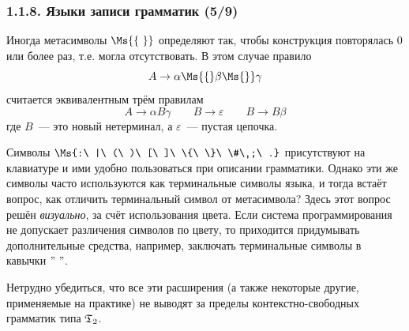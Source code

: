 \begin{frame}
\frametitle{1.1.8. Языки записи грамматик (5/9)}

\vspace{-2pt}
Иногда метасимволы $\Ms{\{\ \}}$ определяют так, чтобы конструкция
повторялась 0 или более раз, т.е. могла отсутствовать. В этом
случае правило
$$
A\rightarrow \alpha\Ms{\{}\beta\Ms{\}}\gamma
$$
считается эквивалентным трём правилам
$$
A\rightarrow \alpha B\gamma 
\qquad B\rightarrow\varepsilon 
\qquad B\rightarrow B \beta
$$
где $B$~--- это новый нетерминал, а $\varepsilon$~--- пустая
цепочка.

\begin{remark} Символы 
$\Ms{:\ |\ (\ )\ [\ ]\ \{\ \}\ \#\ ;\ .}$
присутствуют на клавиатуре и ими 
удобно пользоваться при описании 
грамматики. Однако эти же символы 
часто используются как терминальные 
символы языка, 
и тогда встаёт вопрос,
как отличить терминальный символ
от метасимвола? Здесь этот вопрос
решён {\em визуально}, 
за счёт использования цвета.
Если система программирования
не допускает различения символов по цвету,
то приходится придумывать 
дополнительные средства, например, заключать
терминальные символы в кавычки $"\ "$.
\end{remark}

Нетрудно убедиться, что все эти расширения (а также некоторые
другие, применяемые на практике) не выводят за пределы
контекстно-свободных грамматик типа $\frak{T}_2$.

\end{frame}



